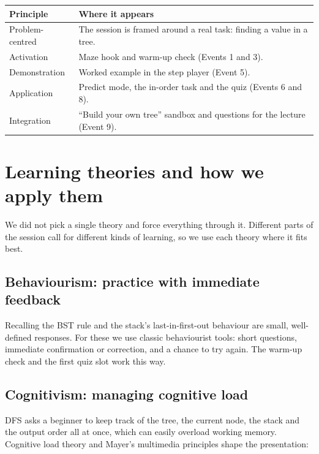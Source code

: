 \documentclass[11pt,a4paper]{article}
\begin{document}
\begin{tabularx}{\textwidth}{@{}l L@{}}
  \toprule
  \textbf{Principle} & \textbf{Where it appears} \\
  \midrule
  Problem-centred & The session is framed around a real task: finding a value in a tree. \\
  Activation      & Maze hook and warm-up check (Events 1 and 3). \\
  Demonstration   & Worked example in the step player (Event 5). \\
  Application     & Predict mode, the in-order task and the quiz (Events 6 and 8). \\
  Integration     & ``Build your own tree'' sandbox and questions for the lecture (Event 9). \\
  \bottomrule
\end{tabularx}

\section{Learning theories and how we apply them}
\label{sec:theory}

We did not pick a single theory and force everything through it. Different parts of the session
call for different kinds of learning, so we use each theory where it fits best.

\subsection{Behaviourism: practice with immediate feedback}

Recalling the BST rule and the stack's last-in-first-out behaviour are small, well-defined
responses. For these we use classic behaviourist tools: short questions, immediate confirmation
or correction, and a chance to try again. The warm-up check and the first quiz slot work this way.

\subsection{Cognitivism: managing cognitive load}

DFS asks a beginner to keep track of the tree, the current node, the stack and the output order all
at once, which can easily overload working memory. Cognitive load theory \cite{sweller1988} and
Mayer's multimedia principles \cite{mayer2009} shape the presentation:
\end{document}
